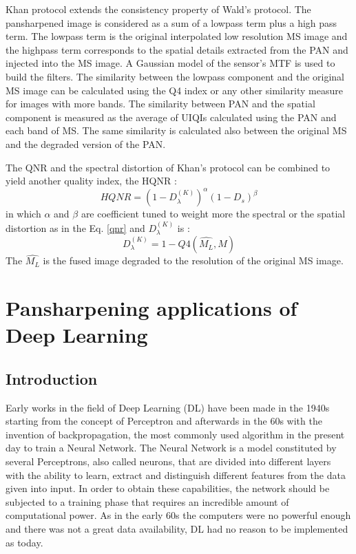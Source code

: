 \documentclass[12pt]{report}
\begin{document}
Khan protocol \cite{khan} extends the consistency property of Wald's protocol.
The pansharpened image is considered as a sum of a lowpass term plus a high pass term.
The lowpass term is the original interpolated low resolution MS image and
the highpass term corresponds to the spatial details extracted from the PAN and injected into the MS image.
A Gaussian model of the sensor's MTF is used to build the filters. The similarity between the lowpass component and
the original MS image can be calculated using the Q4 index or any other similarity measure for images with more bands.
The similarity between PAN and the spatial component is measured as the average of UIQIs calculated using the PAN and each band of MS.
The same similarity is calculated also between the original MS and the degraded version of the PAN.

The QNR and the spectral distortion of Khan's protocol can be combined to yield another quality index, the HQNR \cite{hqnr}:
%
\begin{equation}
    HQNR = (1 - D_\lambda^{(K)})^\alpha (1 - D_s)^\beta
    \label{hqnr}
\end{equation}
%
in which $\alpha$ and $\beta$ are coefficient tuned to weight more the spectral or the spatial distortion as in the Eq. \ref{qnr} and $D_\lambda^{(K)}$ is :
%
\begin{equation}
    D_\lambda^{(K)} = 1 - Q4(\widehat{M_L}, M)
    \label{dlhqnr}
\end{equation}
%
The $ \widehat{M_L} $ is the fused image degraded to the resolution of the original MS image. 


\chapter{Pansharpening applications of Deep Learning}

\section{Introduction}

Early works in the field of Deep Learning (DL) have been made in the 1940s starting from the concept of Perceptron \cite{perceptron} and afterwards in the 60s with the invention
of backpropagation, the most commonly used algorithm in the present day to train a Neural Network.
The Neural Network is a model constituted by several Perceptrons, also called neurons, that are divided into different layers with the 
ability to learn, extract and distinguish different features from the data given into input.
In order to obtain these capabilities, the network should be subjected to a training phase that requires an incredible amount of
computational power.
As in the early 60s the computers were no powerful enough and there was not a great data availability,
DL had no reason to be implemented as today.
\end{document}
